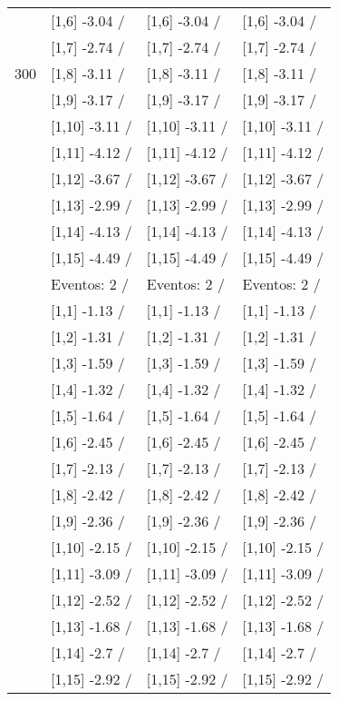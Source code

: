 \begin{table}
\begin{tabular}[t]{llll}
 & {}[1,6] -3.04  / & {}[1,6] -3.04  / & {}[1,6] -3.04  /\\
 & {}[1,7] -2.74  / & {}[1,7] -2.74  / & {}[1,7] -2.74  /\\
300 & {}[1,8] -3.11  / & {}[1,8] -3.11  / & {}[1,8] -3.11  /\\
\addlinespace
 & {}[1,9] -3.17  / & {}[1,9] -3.17  / & {}[1,9] -3.17  /\\
 & {}[1,10] -3.11  / & {}[1,10] -3.11  / & {}[1,10] -3.11  /\\
 & {}[1,11] -4.12  / & {}[1,11] -4.12  / & {}[1,11] -4.12  /\\
 & {}[1,12] -3.67  / & {}[1,12] -3.67  / & {}[1,12] -3.67  /\\
 & {}[1,13] -2.99  / & {}[1,13] -2.99  / & {}[1,13] -2.99  /\\
\addlinespace
 & {}[1,14] -4.13  / & {}[1,14] -4.13  / & {}[1,14] -4.13  /\\
 & {}[1,15] -4.49  / & {}[1,15] -4.49  / & {}[1,15] -4.49  /\\
 & Eventos:  2 / & Eventos:  2 / & Eventos:  2 /\\
 & {}[1,1] -1.13  / & {}[1,1] -1.13  / & {}[1,1] -1.13  /\\
 & {}[1,2] -1.31  / & {}[1,2] -1.31  / & {}[1,2] -1.31  /\\
\addlinespace
 & {}[1,3] -1.59  / & {}[1,3] -1.59  / & {}[1,3] -1.59  /\\
 & {}[1,4] -1.32  / & {}[1,4] -1.32  / & {}[1,4] -1.32  /\\
 & {}[1,5] -1.64  / & {}[1,5] -1.64  / & {}[1,5] -1.64  /\\
 & {}[1,6] -2.45  / & {}[1,6] -2.45  / & {}[1,6] -2.45  /\\
 & {}[1,7] -2.13  / & {}[1,7] -2.13  / & {}[1,7] -2.13  /\\
\addlinespace
500 & {}[1,8] -2.42  / & {}[1,8] -2.42  / & {}[1,8] -2.42  /\\
 & {}[1,9] -2.36  / & {}[1,9] -2.36  / & {}[1,9] -2.36  /\\
 & {}[1,10] -2.15  / & {}[1,10] -2.15  / & {}[1,10] -2.15  /\\
 & {}[1,11] -3.09  / & {}[1,11] -3.09  / & {}[1,11] -3.09  /\\
 & {}[1,12] -2.52  / & {}[1,12] -2.52  / & {}[1,12] -2.52  /\\
\addlinespace
 & {}[1,13] -1.68  / & {}[1,13] -1.68  / & {}[1,13] -1.68  /\\
 & {}[1,14] -2.7  / & {}[1,14] -2.7  / & {}[1,14] -2.7  /\\
 & {}[1,15] -2.92  / & {}[1,15] -2.92  / & {}[1,15] -2.92  /\\
\bottomrule
\end{tabular}
\end{table}
